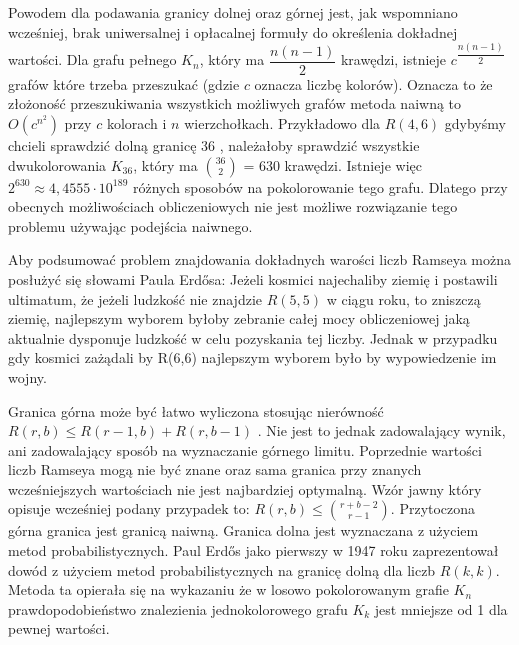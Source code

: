 Powodem dla podawania granicy dolnej oraz górnej jest, jak wspomniano wcześniej, brak uniwersalnej i opłacalnej formuły do określenia dokładnej wartości. Dla grafu pełnego $\mathit{K}_{n}$, który ma ${\dfrac{n(n-1)}{2}}$ krawędzi, istnieje $c^{\dfrac{n(n-1)}{2}}$ grafów które trzeba przeszukać (gdzie $c$ oznacza liczbę kolorów). Oznacza to że złożoność przeszukiwania wszystkich możliwych grafów metoda naiwną to $O(c^{n^{2}})$ przy $c$ kolorach i $n$ wierzchołkach. Przykładowo dla $R(4,6)$ gdybyśmy chcieli sprawdzić dolną granicę 36 \cite{smallramsey}, należałoby sprawdzić wszystkie dwukolorowania $\mathit{K}_{36}$, który ma ${36\choose 2}$ = 630 krawędzi. Istnieje więc $2^{630} \approx 4,4555 \cdot 10^{189}$ różnych sposobów na pokolorowanie tego grafu. Dlatego przy obecnych możliwościach obliczeniowych nie jest możliwe rozwiązanie tego problemu używając podejścia naiwnego. \par

Aby podsumować problem znajdowania dokładnych warości liczb Ramseya można posłużyć się słowami Paula Erdősa: Jeżeli kosmici najechaliby ziemię i postawili ultimatum, że jeżeli ludzkość nie znajdzie $R(5,5)$ w ciągu roku, to zniszczą ziemię, najlepszym wyborem byłoby zebranie całej mocy obliczeniowej jaką aktualnie dysponuje ludzkość w celu pozyskania tej liczby. Jednak w przypadku gdy kosmici zażądali by R(6,6) najlepszym wyborem było by wypowiedzenie im wojny.\cite{aliens}  \par

\hfill \par

Granica górna może być łatwo wyliczona stosując nierówność $R(r,b) \le R(r-1,b)+R(r,b-1)$ \cite{graniceupdown}. Nie jest to jednak zadowalający wynik, ani zadowalający sposób na wyznaczanie górnego limitu. Poprzednie wartości liczb Ramseya mogą nie być znane oraz sama granica przy znanych wcześniejszych wartościach nie jest najbardziej optymalną. Wzór jawny który opisuje wcześniej podany przypadek to: $R(r,b) \le {r+b-2\choose r-1}$. Przytoczona górna granica jest granicą naiwną. Granica dolna jest wyznaczana z użyciem metod probabilistycznych. Paul Erdős jako pierwszy w 1947 roku zaprezentował dowód z użyciem metod probabilistycznych na granicę dolną dla liczb $R(k,k)$\cite{erdogranica, theory}. Metoda ta opierała się na wykazaniu że w losowo pokolorowanym grafie $\mathit{K}_{n}$ prawdopodobieństwo znalezienia jednokolorowego grafu $\mathit{K}_{k}$ jest mniejsze od 1 dla pewnej wartości.


